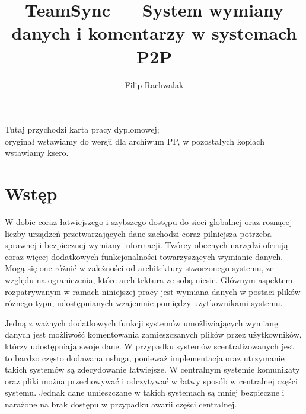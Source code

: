 \documentclass[polish,a4paper,twoside]{ppfcmthesis}
\author{Filip Rachwalak}                              %
\title{TeamSync --- System wymiany danych i komentarzy w systemach P2P}                   %
\begin{document}
\frontmatter\pagestyle{empty}%
\maketitle\cleardoublepage%

\thispagestyle{empty}\vspace*{\fill}%
\begin{center}Tutaj przychodzi karta pracy dyplomowej;\\oryginał wstawiamy do wersji dla archiwum PP, w pozostałych kopiach wstawiamy ksero.\end{center}%
\vfill\cleardoublepage%

\pagestyle{ppfcmthesis}%
\tableofcontents* \cleardoublepage%

\mainmatter%

\chapter{Wstęp}

W dobie coraz łatwiejszego i szybszego dostępu do sieci globalnej oraz rosnącej liczby urządzeń przetwarzających dane zachodzi coraz pilniejsza potrzeba sprawnej i bezpiecznej wymiany informacji. Twórcy obecnych narzędzi oferują coraz więcej dodatkowych funkcjonalności towarzyszących wymianie danych. Mogą się one różnić w zależności od architektury stworzonego systemu, ze względu na ograniczenia, które architektura ze sobą niesie. Głównym aspektem rozpatrywanym w ramach niniejszej pracy jest wymiana danych w postaci plików różnego typu, udostępnianych wzajemnie pomiędzy użytkownikami systemu.

Jedną z ważnych dodatkowych funkcji systemów umożliwiających wymianę danych jest możliwość komentowania zamieszczanych plików przez użytkowników, którzy udostępniają swoje dane. W przypadku systemów scentralizowanych jest to bardzo często dodawana usługa, ponieważ implementacja oraz utrzymanie takich systemów są zdecydowanie łatwiejsze. W centralnym systemie komunikaty oraz pliki można przechowywać i odczytywać w łatwy sposób w centralnej części systemu. Jednak dane umieszczane w takich systemach są mniej bezpieczne i narażone na brak dostępu w przypadku awarii części centralnej.
\end{document}
